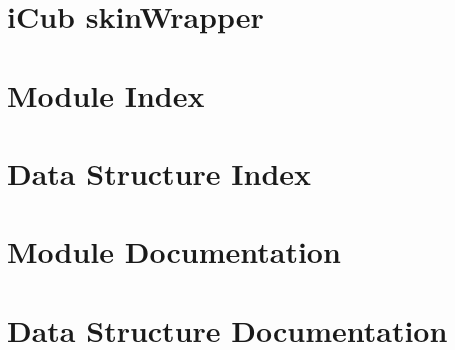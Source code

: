 \documentclass[twoside]{book}
\newcommand{\+}{\discretionary{\mbox{\scriptsize$\hookleftarrow$}}{}{}}
\newcommand{\clearemptydoublepage}{%
  \newpage{\pagestyle{empty}\cleardoublepage}%
}
\begin{document}
\chapter{i\+Cub skin\+Wrapper}
\label{md__home_runner_work_icub-tests_icub-tests_gh-pages_src_skinWrapperTest_README}

\chapter{Module Index}

\chapter{Data Structure Index}

\chapter{Module Documentation}

\chapter{Data Structure Documentation}






















\backmatter
\newpage
{}
\clearemptydoublepage
{}
\printindex
\end{document}
